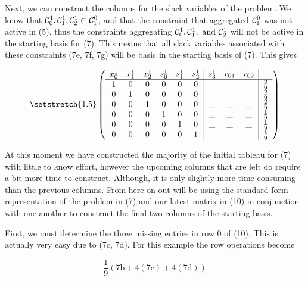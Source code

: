 \documentclass[11pt]{article} %
\newcommand{\cC}{{\cal C}}
\begin{document}
	 Next, we can construct the columns for the slack variables of the problem.  We know that $\cC_0^1, \cC_1^1, \cC_2^1 \subset \cC_1^0$, and that the constraint that aggregated $\cC_1^0$ was not active in (5), thus the constraints aggregating $\cC_0^1, \cC_1^1, \ \text{and} \  \cC_2^1$ will not be active in the starting basis for (7).  This means that all slack variables associated with these constraints (7e, 7f, 7g) will be basic in the starting basis of (7).  This gives
	 
	\begin{equation}\setstretch{1.5}
	\begin{pmatrix}
	\begin{array}{cccccc|ccc|c}
		\bar{x}^1_0 & \bar{x}^1_1 & \bar{x}^1_2 & \bar{s}^1_0 & \bar{s}^1_1 & \bar{s}^1_2 & \bar{s}^1_3 & \bar{r}_{01} & \bar{r}_{02} \\
	\hline
	1 & 0 & 0 & 0 & 0 & 0 & \_ & \_ & \_ & \frac{2}{9} \\ 
	0 & 1 & 0 & 0 & 0 & 0 & \_ & \_ & \_ & \frac{2}{9} \\ 
	0 & 0 & 1 & 0 & 0 & 0 & \_ & \_ & \_ & \frac{2}{9} \\ 
	0 & 0 & 0 & 1 & 0 & 0 &\_ & \_ & \_ & \frac{1}{9} \\ 
	0 & 0 & 0 & 0 & 1 & 0 &\_ & \_ & \_ & \frac{1}{9} \\
	0 & 0 & 0 & 0 & 0 & 1 & \_ & \_ & \_ & \frac{1}{9} \\
	\end{array}
	\end{pmatrix}
	\end{equation}
	
	At this moment we have constructed the majority of the initial tableau for (7) with little to know effort, however the upcoming columns that are left do require a bit more time to construct.  Although, it is only slightly more time consuming than the previous columns.  From here on out will be using the standard form representation of the problem in (7) and our latest matrix in (10) in conjunction with one another to construct the final two columns of the starting basis.	
	
	First, we must determine the three missing entries in row 0 of (10).  This is actually very easy due to (7c, 7d).  For this example the row operations become
	
	\begin{equation}
	\frac{1}{9}(7\text{b} + 4(7\text{c}) + 4(7\text{d}))
	\end{equation}   
	
\end{document}

